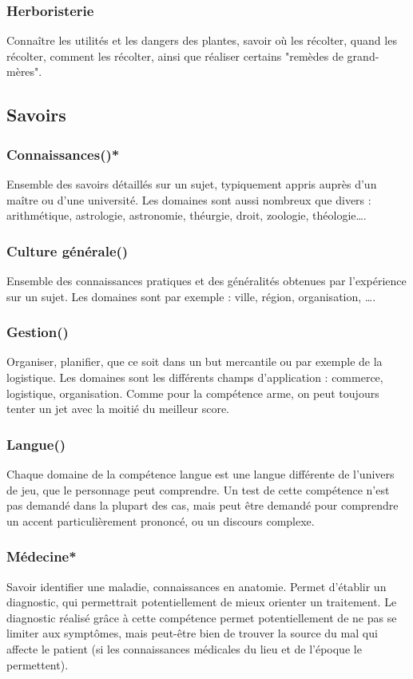 \documentclass[10pt,a4paper,twocolumn]{book}
\begin{document}
\subsubsection{Herboristerie}
Connaître les utilités et les dangers des plantes, savoir où les récolter, quand les récolter, comment les récolter, ainsi que réaliser certains "remèdes de grand-mères".

\subsection{Savoirs}
\subsubsection{Connaissances()*}
Ensemble des savoirs détaillés sur un sujet, typiquement appris auprès d’un maître ou d’une université. Les domaines sont aussi nombreux que divers : arithmétique, astrologie, astronomie, théurgie, droit, zoologie, théologie….
\subsubsection{Culture générale()}
Ensemble des connaissances pratiques et des généralités obtenues par l’expérience sur un sujet. Les domaines sont par exemple : ville, région, organisation, ….
\subsubsection{Gestion()}
Organiser, planifier, que ce soit dans un but mercantile ou par exemple de la logistique. Les domaines sont les différents champs d’application : commerce, logistique, organisation.  Comme pour la compétence arme, on peut toujours tenter un jet avec la moitié du meilleur score.
\subsubsection{Langue()}
Chaque domaine de la compétence langue est une langue différente de l’univers de jeu, que le personnage peut comprendre.
Un test de cette compétence n’est pas demandé dans la plupart des cas, mais peut être demandé pour comprendre un accent particulièrement prononcé, ou un discours complexe.
\subsubsection{Médecine*}
Savoir identifier une maladie, connaissances en anatomie. Permet d'établir un diagnostic, qui permettrait potentiellement de mieux orienter un traitement. Le diagnostic réalisé grâce à cette compétence permet potentiellement de ne pas se limiter aux symptômes, mais peut-être bien de trouver la source du mal qui affecte le patient (si les connaissances médicales du lieu et de l'époque le permettent).
\end{document}
